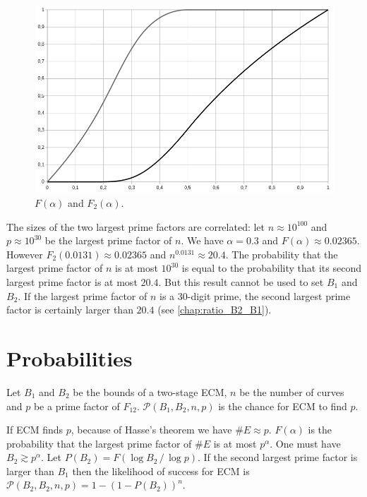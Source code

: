 \documentclass[a4paper, 11pt, pdftex]{report}
\theoremstyle{plain}
\theoremstyle{definition}
\begin{document}
\begin{figure}[!ht]
	\centering
	\includegraphics[width=15.5cm, angle=0]{img/F1_F2.png}
	\caption{\label{fig:F_12} $F(\alpha)$ and $F_2(\alpha)$.}
\end{figure}

The sizes of the two largest prime factors are correlated: let $n \approx 10^{100}$
and $p \approx 10^{30}$ be the largest prime factor of $n$. We have $\alpha = 0.3$
and $F(\alpha) \approx 0.02365$. However $F_2(0.0131) \approx 0.02365$ and
$n^{0.0131} \approx 20.4$.
The probability that the largest prime factor of $n$ is at most $10^{30}$ is equal to
the probability that its second largest prime factor is at most $20.4$. But this result
cannot be used to set $B_1$ and $B_2$. If the largest prime factor of $n$ is a 30-digit
prime, the second largest prime factor is certainly larger than $20.4$
(see \autoref{chap:ratio_B2_B1}).

\section{Probabilities}

Let $B_1$ and $B_2$ be the bounds of a two-stage ECM, $n$ be the number of curves and $p$
be a prime factor of $F_{12}$. $\mathcal{P}(B_1, B_2, n, p)$ is the chance for ECM to
find $p$.

If ECM finds $p$, because of Hasse's theorem we have $\#E \approx p$. $F(\alpha)$ is the probability that
the largest prime factor of $\#E$ is at most $p^\alpha$. One must have $B_2 \gtrsim p^\alpha$.
Let $P(B_2) = F(\log B_2\, /\, \log p)$. If the second largest prime factor is larger than $B_1$
then the likelihood of success for ECM is
$\mathcal{P}(B_2, B_2, n, p) = 1 - \left(1 - P(B_2) \right)^n$.
\end{document}
